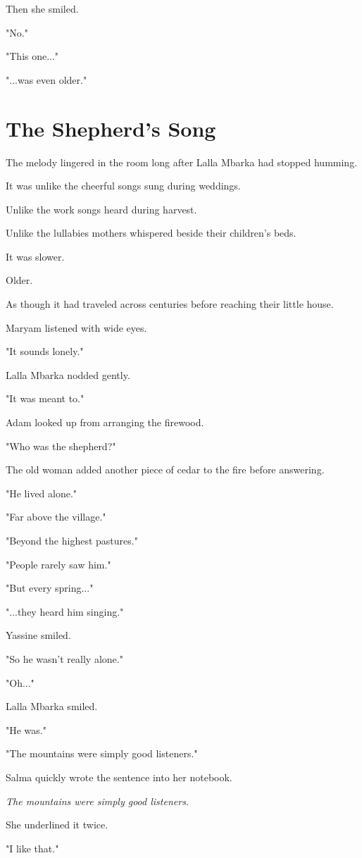 \documentclass[12pt,openany]{book}
\begin{document}
Then she smiled.

"No."

"This one..."

"...was even older."
\section*{The Shepherd's Song}

The melody lingered in the room long after Lalla Mbarka had stopped humming.

It was unlike the cheerful songs sung during weddings.

Unlike the work songs heard during harvest.

Unlike the lullabies mothers whispered beside their children's beds.

It was slower.

Older.

As though it had traveled across centuries before reaching their little house.

Maryam listened with wide eyes.

"It sounds lonely."

Lalla Mbarka nodded gently.

"It was meant to."

Adam looked up from arranging the firewood.

"Who was the shepherd?"

The old woman added another piece of cedar to the fire before answering.

"He lived alone."

"Far above the village."

"Beyond the highest pastures."

"People rarely saw him."

"But every spring..."

"...they heard him singing."

Yassine smiled.

"So he wasn't really alone."

"Oh..."

Lalla Mbarka smiled.

"He was."

"The mountains were simply good listeners."

Salma quickly wrote the sentence into her notebook.

\emph{The mountains were simply good listeners.}

She underlined it twice.

"I like that."
\end{document}
